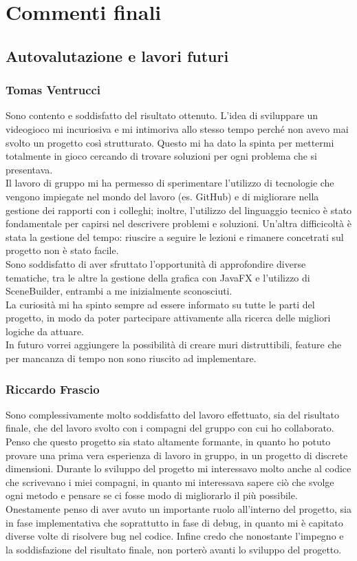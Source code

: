 \documentclass[a4paper,12pt]{report}
\begin{document}
\chapter{Commenti finali}
\section{Autovalutazione e lavori futuri}
\subsection*{Tomas Ventrucci}
Sono contento e soddisfatto del risultato ottenuto. L’idea di sviluppare un videogioco mi incuriosiva e mi intimoriva allo stesso tempo perché non avevo mai svolto un progetto così strutturato. Questo mi ha dato la spinta per mettermi totalmente in gioco cercando di trovare soluzioni per ogni problema che si presentava.\\ 
Il lavoro di gruppo mi ha permesso di sperimentare l’utilizzo di tecnologie che vengono impiegate nel mondo del lavoro (es. GitHub) e di migliorare nella gestione dei rapporti con i colleghi; inoltre, l'utilizzo del linguaggio tecnico è stato fondamentale per capirsi nel descrivere problemi e soluzioni. Un'altra difficicoltà è stata la gestione del tempo: riuscire a seguire le lezioni e rimanere concetrati sul progetto non è stato facile.\\
Sono soddisfatto di aver sfruttato l'opportunità di approfondire diverse tematiche, tra le altre la gestione della grafica con JavaFX e l’utilizzo di SceneBuilder, entrambi a me inizialmente sconosciuti.\\
La curiosità mi ha spinto sempre ad essere informato su tutte le parti del progetto, in modo da poter partecipare attivamente alla ricerca delle migliori logiche da attuare.\\
In futuro vorrei aggiungere la possibilità di creare muri distruttibili, feature che per mancanza di tempo non sono riuscito ad implementare.
\newpage
\subsection*{Riccardo Frascio}
Sono complessivamente molto soddisfatto del lavoro effettuato, sia del risultato finale, che del lavoro svolto con i compagni del gruppo con cui ho collaborato. Penso che questo progetto sia stato altamente formante, in quanto ho potuto provare una prima vera esperienza di lavoro in gruppo, in un progetto di discrete dimensioni. Durante lo sviluppo del progetto mi interessavo molto anche al codice che scrivevano i miei compagni, in quanto mi interessava sapere ciò che svolge ogni metodo e pensare se ci fosse modo di migliorarlo il più possibile. Onestamente penso di aver avuto un importante ruolo all’interno del progetto, sia in fase implementativa che  soprattutto in fase di debug, in quanto mi è capitato diverse volte di risolvere bug nel codice. Infine credo che nonostante l’impegno e la soddisfazione del risultato finale, non porterò avanti lo sviluppo del progetto.
\end{document}
